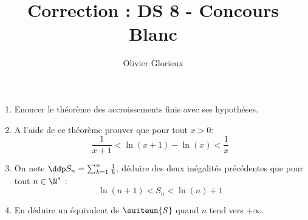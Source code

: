 \documentclass[a4paper, 11pt,reqno]{article}
\author{Olivier Glorieux}
\begin{document}
\title{Correction : DS 8 - Concours Blanc
}

%
%

\begin{exercice}
\begin{enumerate}
\item Enoncer le théorème des accroissements finis avec ses hypothéses. 
\item A l'aide de ce théorème prouver que pour tout $x>0$:
$$\frac{1}{x+1} <\ln(x+1) -\ln(x) < \frac{1}{x}$$
\item On note $\ddp S_n=\sum_{k=1}^n \frac{1}{k}$, déduire des deux inégalités précédentes  que  pour tout $n\in \N^*$ :
$$\ln(n+1) <S_n  <\ln(n)+1$$
\item En déduire un équivalent de $\suiteun{S}$ quand $n$ tend vers $+\infty$. 



\end{enumerate}
\end{exercice}
\end{document}
